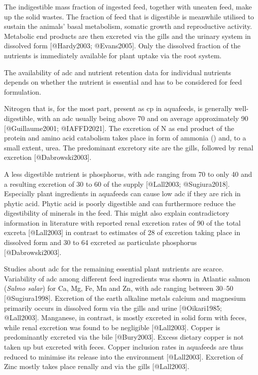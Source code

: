 The indigestible mass fraction of ingested feed, together with uneaten feed, make up the solid wastes. The fraction of feed that is digestible is meanwhile utilised to sustain the animals’ basal metabolism, somatic growth and reproductive activity. Metabolic end products are then excreted via the gills and the urinary system in dissolved form [@Hardy2003; @Evans2005]. Only the dissolved fraction of the nutrients is immediately available for plant uptake via the root system.

The availability of \gls{adc} and nutrient retention data for individual nutrients depends on whether the nutrient is essential and has to be considered for feed formulation.




Nitrogen that is, for the most part, present as \gls{cp} in aquafeeds, is generally well-digestible, with an \gls{adc} usually being above \SI{70}{\p} and on average approximately \SI{90}{\p} [@Guillaume2001; @IAFFD2021]. The excretion of N as end product of the protein and amino acid catabolism takes place in form of ammonia () and, to a small extent, urea. The predominant excretory site are the gills, followed by renal excretion [@Dabrowski2003].

A less digestible nutrient is phosphorus, with \gls{adc} ranging from \SI{70}{\p} to only \SI{40}{\p} and a resulting excretion of \SI{30}{\p} to \SI{60}{\p} of the supply [@Lall2003; @Sugiura2018]. Especially plant ingredients in aquafeeds can cause low \gls{adc} if they are rich in phytic acid. Phytic acid is poorly digestible and can furthermore reduce the digestibility of minerals in the feed. This might also explain contradictory information in literature with reported renal excretion rates of \SI{90}{\p} of the total excreta [@Lall2003] in contrast to estimates of \SI{28}{\p} of excretion taking place in dissolved form and \SI{30}{\p} to \SI{64}{\p} excreted as particulate phosphorus [@Dabrowski2003].

Studies about \gls{adc} for the remaining essential plant nutrients are scarce. Variability of \gls{adc} among different feed ingredients was shown in Atlantic salmon (\emph{Salmo salar}) for Ca, Mg, Fe, Mn and Zn, with \gls{adc} ranging between \SIrange{30}{50}{\p} [@Sugiura1998]. Excretion of the earth alkaline metals calcium and magnesium primarily occurs in dissolved form via the gills and urine [@Oikari1985; @Lall2003]. Manganese, in contrast, is mostly excreted in solid form with feces, while renal excretion was found to be negligible [@Lall2003]. Copper is predominantly excreted via the bile [@Bury2003]. Excess dietary copper is not taken up but excreted with feces. Copper inclusion rates in aquafeeds are thus reduced to minimise its release into the environment [@Lall2003]. Excretion of Zinc mostly takes place renally and via the gills [@Lall2003].


